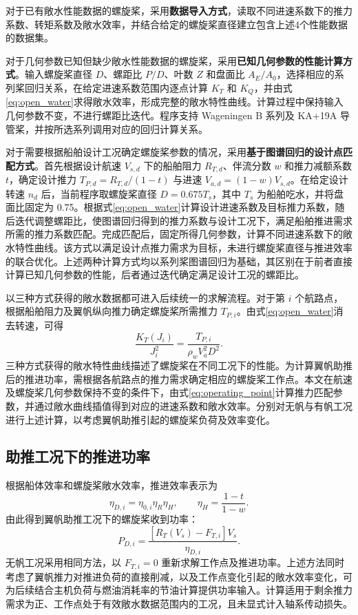 \documentclass[UTF8,a4paper,twoside,zihao=5,fontset=windows]{ctexart}
\begin{document}
对于已有敞水性能数据的螺旋桨，采用\textbf{数据导入方式}，读取不同进速系数下的推力系数、转矩系数及敞水效率，并结合给定的螺旋桨直径建立包含上述4个性能数据的数据集。

对于几何参数已知但缺少敞水性能数据的螺旋桨，采用\textbf{已知几何参数的性能计算方式}。输入螺旋桨直径 $D$、螺距比 $P/D$、叶数 $Z$ 和盘面比 $A_E/A_0$，选择相应的系列桨回归关系，在给定进速系数范围内逐点计算 $K_T$ 和 $K_Q$，并由式\eqref{eq:open_water}求得敞水效率，形成完整的敞水特性曲线。计算过程中保持输入几何参数不变，不进行螺距比迭代。程序支持 Wageningen B 系列及 KA+19A 导管桨，并按所选系列调用对应的回归计算关系。

对于需要根据船舶设计工况确定螺旋桨参数的情况，采用\textbf{基于图谱回归的设计点匹配方式}。首先根据设计航速 $V_{s,d}$ 下的船舶阻力 $R_{T,d}$、伴流分数 $w$ 和推力减额系数 $t$，确定设计推力 $T_{P,d}=R_{T,d}/(1-t)$ 与进速 $V_{a,d}=(1-w)V_{s,d}$。在给定设计转速 $n_d$ 后，当前程序取螺旋桨直径 $D=0.675T_s$，其中 $T_s$ 为船舶吃水，并将盘面比固定为 0.75。根据式\eqref{eq:open_water}计算设计进速系数及目标推力系数，随后迭代调整螺距比，使图谱回归得到的推力系数与设计工况下，满足船舶推进需求所需的推力系数匹配。完成匹配后，固定所得几何参数，计算不同进速系数下的敞水特性曲线。该方式以满足设计点推力需求为目标，未进行螺旋桨直径与推进效率的联合优化。上述两种计算方式均以系列桨图谱回归为基础，其区别在于前者直接计算已知几何参数的性能，后者通过迭代确定满足设计工况的螺距比。

以三种方式获得的敞水数据都可进入后续统一的求解流程。对于第 $i$ 个航路点，根据船舶阻力及翼帆纵向推力确定螺旋桨所需推力 $T_{P,i}$。由式\eqref{eq:open_water}消去转速，可得
\begin{equation}
\frac{K_T(J_i)}{J_i^2}=\frac{T_{P,i}}{\rho_w V_a^2D^2}.
\label{eq:operating_point}
\end{equation}
三种方式获得的敞水特性曲线描述了螺旋桨在不同工况下的性能。为计算翼帆助推后的推进功率，需根据各航路点的推力需求确定相应的螺旋桨工作点。本文在航速及螺旋桨几何参数保持不变的条件下，由式\eqref{eq:operating_point}计算推力匹配参数，并通过敞水曲线插值得到对应的进速系数和敞水效率。分别对无帆与有帆工况进行上述计算，以考虑翼帆助推引起的螺旋桨负荷及效率变化。

\subsection{助推工况下的推进功率}

根据船体效率和螺旋桨敞水效率，推进效率表示为
\begin{equation}
\eta_{D,i}=\eta_{0,i}\eta_R\eta_H,\qquad \eta_H=\frac{1-t}{1-w}.
\label{eq:efficiency}
\end{equation}
由此得到翼帆助推工况下的螺旋桨收到功率：
\begin{equation}
P_{D,i}=\frac{\left[R_T(V_s)-F_{T,i}\right]V_s}{\eta_{D,i}}.
\label{eq:power}
\end{equation}
无帆工况采用相同方法，以 $F_{T,i}=0$ 重新求解工作点及推进功率。上述方法同时考虑了翼帆推力对推进负荷的直接削减，以及工作点变化引起的敞水效率变化，可为后续结合主机负荷与燃油消耗率的节油计算提供功率输入。计算适用于剩余推力需求为正、工作点处于有效敞水数据范围内的工况，且未显式计入轴系传动损失。
\end{document}
